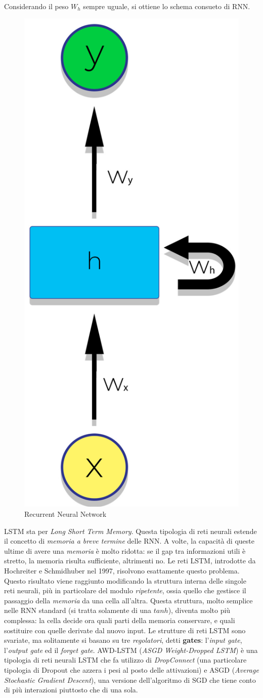 Considerando il peso $W_h$ sempre uguale, si ottiene lo schema consueto di RNN.
\begin{figure}[H]
    \begin{center}
        \includegraphics[width=0.3\columnwidth]{images/fallback/folded-RNN.jpg}
    \end{center}
    \caption{Recurrent Neural Network}
    \label{fig:folded-RNN}
\end{figure}
LSTM sta per \textit{Long Short Term Memory}. Questa tipologia di reti neurali estende il concetto di \textit{memoria a breve termine} delle RNN. A volte, la capacità di queste ultime di avere una \textit{memoria} è molto ridotta: se il gap tra informazioni utili è stretto, la memoria risulta sufficiente, altrimenti no. Le reti LSTM, introdotte da Hochreiter e Schmidhuber nel 1997\cite{paper:hochreiter1997long}, risolvono esattamente questo problema. Questo risultato viene raggiunto modificando la struttura interna delle singole reti neurali, più in particolare del modulo \textit{ripetente}, ossia quello che gestisce il passaggio della \textit{memoria} da una cella all'altra. Questa struttura, molto semplice nelle RNN standard (si tratta solamente di una $tanh$), diventa molto più complessa: la cella decide ora quali parti della memoria conservare, e quali sostituire con quelle derivate dal nuovo input. Le strutture di reti LSTM sono svariate, ma solitamente si basano su tre \textit{regolatori}, detti \textbf{gates}: l'\textit{input gate}, l'\textit{output gate} ed il \textit{forget gate}. AWD-LSTM (\textit{ASGD Weight-Dropped LSTM}) è una tipologia di reti neurali LSTM che fa utilizzo di \textit{DropConnect} (una particolare tipologia di Dropout che azzera i pesi al posto delle attivazioni) e ASGD (\textit{Average Stochastic Gradient Descent}), una versione dell'algoritmo di SGD che tiene conto di più interazioni piuttosto che di una sola.

